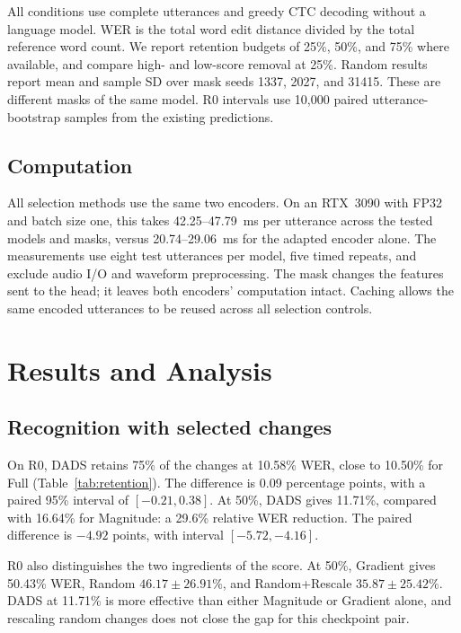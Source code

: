 \documentclass{article}
\begin{document}
All conditions use complete utterances and greedy CTC decoding without a language model. WER is the total word edit distance divided by the total reference word count. We report retention budgets of 25\%, 50\%, and 75\% where available, and compare high- and low-score removal at 25\%. Random results report mean and sample SD over mask seeds 1337, 2027, and 31415. These are different masks of the same model. R0 intervals use 10,000 paired utterance-bootstrap samples from the existing predictions.

\subsection{Computation}
All selection methods use the same two encoders. On an RTX~3090 with FP32 and batch size one, this takes 42.25--47.79~ms per utterance across the tested models and masks, versus 20.74--29.06~ms for the adapted encoder alone. The measurements use eight test utterances per model, five timed repeats, and exclude audio I/O and waveform preprocessing. The mask changes the features sent to the head; it leaves both encoders' computation intact. Caching allows the same encoded utterances to be reused across all selection controls.

\section{Results and Analysis}
\label{sec:results}
\subsection{Recognition with selected changes}
On R0, DADS retains 75\% of the changes at 10.58\% WER, close to 10.50\% for Full (Table~\ref{tab:retention}). The difference is 0.09 percentage points, with a paired 95\% interval of $[-0.21,0.38]$. At 50\%, DADS gives 11.71\%, compared with 16.64\% for Magnitude: a 29.6\% relative WER reduction. The paired difference is $-4.92$ points, with interval $[-5.72,-4.16]$.

\begin{table}[t]
\centering
\caption{Test WER (\%) after retaining selected changes. R0 uses a separate reference checkpoint; W1/W2/D0 use their fine-tuning initialization. Full and NoShift retain all and none of the changes, respectively.}
\label{tab:retention}

\end{table}

R0 also distinguishes the two ingredients of the score. At 50\%, Gradient gives 50.43\% WER, Random $46.17\pm26.91\%$, and Random+Rescale $35.87\pm25.42\%$. DADS at 11.71\% is more effective than either Magnitude or Gradient alone, and rescaling random changes does not close the gap for this checkpoint pair.
\end{document}
